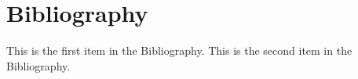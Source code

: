 \chapter{Bibliography}
\begin{thebibliography}{99}
  This is the first item in the Bibliography.
  This is the second item in the Bibliography.
\end{thebibliography}
